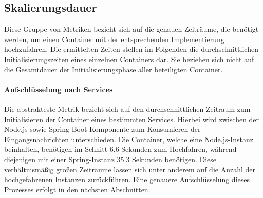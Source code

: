 \subsection{Skalierungsdauer}
Diese Gruppe von Metriken bezieht sich auf die genauen Zeiträume, die benötigt werden, um einen Container mit der entsprechenden Implementierung hochzufahren. Die ermittelten Zeiten stellen im Folgenden die durchschnittlichen Initialisierungszeiten eines einzelnen Containers dar. Sie beziehen sich nicht auf die Gesamtdauer der Initialisierungsphase aller beteiligten Container.


\paragraph{Aufschlüsselung nach Services}
Die abstrakteste Metrik bezieht sich auf den durchschnittlichen Zeitraum zum Initialisieren der Container eines bestimmten Services. Hierbei wird zwischen der Node.js sowie Spring-Boot-Komponente zum Konsumieren der Eingangsnachrichten unterschieden. Die Container, welche eine Node.js-Instanz beinhalten, benötigen im Schnitt 6.6 Sekunden zum Hochfahren, während diejenigen mit einer Spring-Instanz 35.3 Sekunden benötigen. Diese verhältnismäßig großen Zeiträume lassen sich unter anderem auf die Anzahl der hochgefahrenen Instanzen zurückführen. Eine genauere Aufschlüsselung dieses Prozesses erfolgt in den nächsten Abschnitten.

